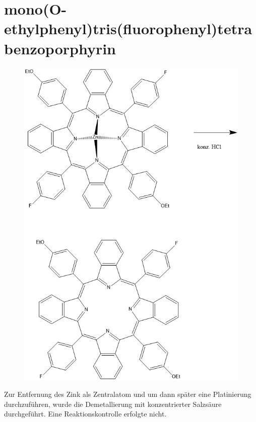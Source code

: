 \section{mono(O-ethylphenyl)tris(fluorophenyl)tetrabenzoporphyrin}
\begin{figure}[!htpb]
\centering
\includegraphics[scale=0.5]{graphics/entmetZnmonoettrifphenTBP}
\end{figure}
Zur Entfernung des Zink als Zentralatom und um dann später eine Platinierung durchzuführen, wurde die Demetallierung mit konzentrierter Salzsäure durchgeführt. Eine Reaktionskontrolle erfolgte nicht.



